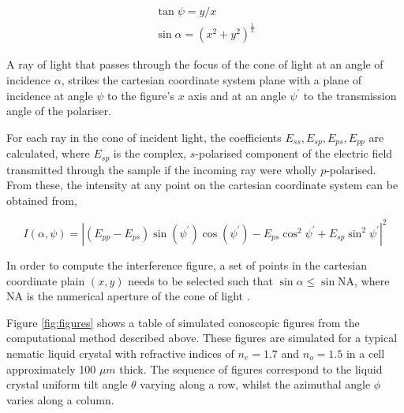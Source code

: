 \begin{eqnarray}
\tan\psi=y/x\\
\sin\alpha=\left(x^2+y^2\right)^{\frac{1}{2}}
\end{eqnarray}

A ray of light that passes through the focus of the cone of light at an angle of incidence $\alpha$, strikes the cartesian coordinate system plane with a plane of incidence at angle $\psi$ to the figure's $x$ axis and at an angle $\psi^{\prime}$ to the transmission angle of the polariser. 

For each ray in the cone of incident light, the coefficients $E_{ss},E_{sp},E_{ps},E_{pp}$ are calculated, where $E_{sp}$ is the complex, $s$-polarised component of the electric field transmitted through the sample if the incoming ray were wholly $p$-polarised. From these, the intensity at any point on the cartesian coordinate system can be obtained \cite{Cornford2008} from,

\begin{equation}
I\left(\alpha,\psi\right)=\left|\left(E_{pp}-E_{ps}\right)\sin\left(\psi^{\prime}\right)\cos\left(\psi^{\prime}\right)-E_{ps}\cos^2\psi^{\prime}+E_{sp}\sin^2\psi^{\prime}\right|^2
\end{equation}

In order to compute the interference figure, a set of points in the cartesian coordinate plain $\left(x,y\right)$ needs to be selected such that $\sin\alpha\leq\sin\text{NA}$, where NA is the numerical aperture of the cone of light \cite{Cornford2008}.

Figure \ref{fig:figures} shows a table of simulated conoscopic figures from the computational method described above. These figures are simulated for a typical nematic liquid crystal with refractive indices of $n_e=1.7$ and $n_o=1.5$ in  a cell approximately 100 $\mu m$ thick. The sequence of figures correspond to the liquid crystal uniform tilt angle $\theta$ varying along a row, whilst the azimuthal angle $\phi$ varies along a column.

